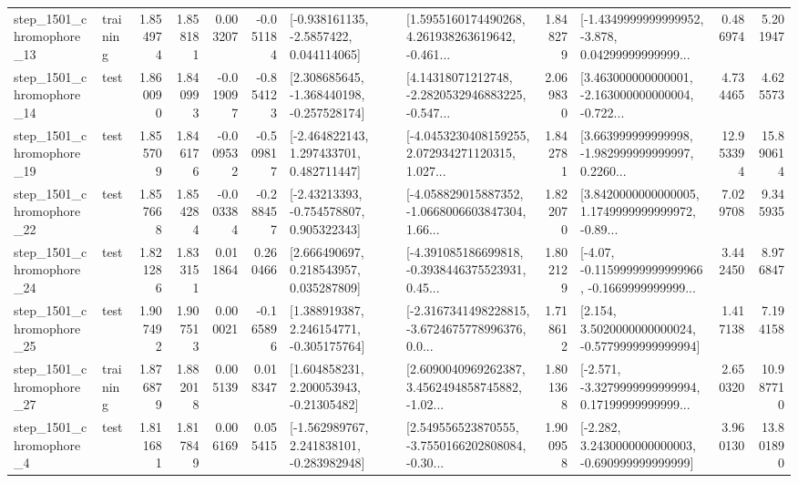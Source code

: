 \begin{tabular}{llrrrrllrlrr}
 step\_1501\_chromophore\_13 &  training &      1.854974 &    1.858181 &      0.003207 & -0.051184 &     [-0.938161135, -2.5857422, 0.044114065] &  [1.5955160174490268, 4.261938263619642, -0.461... &       1.848279 &  [-1.4349999999999952, -3.878, 0.04299999999999... &            0.486974 &          5.201947 \\
 step\_1501\_chromophore\_14 &      test &      1.860090 &    1.840993 &     -0.019097 & -0.854123 &   [2.308685645, -1.368440198, -0.257528174] &  [4.14318071212748, -2.2820532946883225, -0.547... &       2.069830 &  [3.463000000000001, -2.163000000000004, -0.722... &            4.734465 &          4.625573 \\
 step\_1501\_chromophore\_19 &      test &      1.855709 &    1.846176 &     -0.009532 & -0.509817 &    [-2.464822143, 1.297433701, 0.482711447] &  [-4.0453230408159255, 2.072934271120315, 1.027... &       1.842781 &  [3.663999999999998, -1.982999999999997, 0.2260... &           12.953394 &         15.890614 \\
 step\_1501\_chromophore\_22 &      test &      1.857668 &    1.854284 &     -0.003384 & -0.288457 &    [-2.43213393, -0.754578807, 0.905322343] &  [-4.058829015887352, -1.0668006603847304, 1.66... &       1.822070 &  [3.8420000000000005, 1.1749999999999972, -0.89... &            7.029708 &          9.345935 \\
 step\_1501\_chromophore\_24 &      test &      1.821286 &    1.833151 &      0.011864 &  0.260466 &     [2.666490697, 0.218543957, 0.035287809] &  [-4.391085186699818, -0.3938446375523931, 0.45... &       1.802129 &  [-4.07, -0.11599999999999966, -0.1669999999999... &            3.442450 &          8.976847 \\
 step\_1501\_chromophore\_25 &      test &      1.907492 &    1.907513 &      0.000021 & -0.165896 &    [1.388919387, 2.246154771, -0.305175764] &  [-2.3167341498228815, -3.6724675778996376, 0.0... &       1.718612 &   [2.154, 3.5020000000000024, -0.5779999999999994] &            1.417138 &          7.194158 \\
 step\_1501\_chromophore\_27 &  training &      1.876879 &    1.882018 &      0.005139 &  0.018347 &     [1.604858231, 2.200053943, -0.21305482] &  [2.6090040969262387, 3.4562494858745882, -1.02... &       1.801368 &  [-2.571, -3.3279999999999994, 0.17199999999999... &            2.650320 &         10.987710 \\
  step\_1501\_chromophore\_4 &      test &      1.811681 &    1.817849 &      0.006169 &  0.055415 &   [-1.562989767, 2.241838101, -0.283982948] &  [2.549556523870555, -3.7550166202808084, -0.30... &       1.900958 &   [-2.282, 3.2430000000000003, -0.690999999999999] &            3.960130 &         13.801890 \\

\end{tabular}
